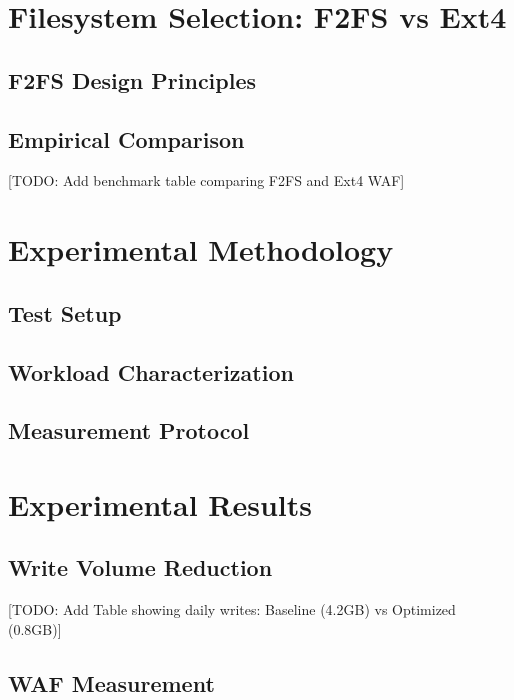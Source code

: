 \documentclass[conference]{IEEEtran}
\begin{document}
\section{Filesystem Selection: F2FS vs Ext4}

\subsection{F2FS Design Principles}
\subsection{Empirical Comparison}

[TODO: Add benchmark table comparing F2FS and Ext4 WAF]

\section{Experimental Methodology}

\subsection{Test Setup}
\subsection{Workload Characterization}
\subsection{Measurement Protocol}

\section{Experimental Results}

\subsection{Write Volume Reduction}

[TODO: Add Table showing daily writes: Baseline (4.2GB) vs Optimized (0.8GB)]

\subsection{WAF Measurement}
\end{document}
